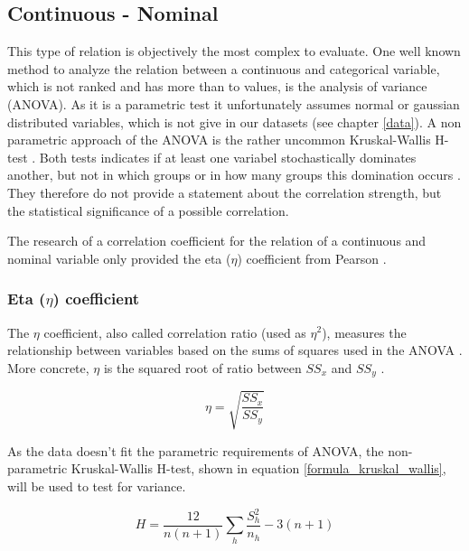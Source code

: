 \documentclass[a4paper,12pt]{report}
\begin{document}
\subsection{Continuous - Nominal}
This type of relation is objectively the most complex to evaluate. One well known method to analyze the relation between a continuous and categorical variable, which is not ranked and has more than to values, is the analysis of variance (ANOVA). As it is a parametric test it unfortunately assumes normal or gaussian distributed variables, which is not give in our datasets (see chapter \ref{data}). A non parametric approach of the ANOVA is the rather uncommon Kruskal-Wallis H-test \cite{Leon1998}. Both tests indicates if at least one variabel stochastically dominates another, but not in which groups or in how many groups this domination occurs \cite{OTSD2020}. They therefore do not provide a statement about the correlation strength, but the statistical significance of a possible correlation.

The research of a correlation coefficient for the relation of a continuous and nominal variable only provided the eta ($\eta$) coefficient from Pearson \cite{Benninghaus2007}. 

\subsubsection{Eta ($\eta$) coefficient}
The $\eta$ coefficient, also called correlation ratio (used as $\eta^2$), measures the relationship between variables based on the sums of squares used in the ANOVA \cite{Lewis2012,Benninghaus2007}. More concrete, $\eta$ is the squared root of ratio between $SS_x$ and $SS_y$ \cite{Shaldehi2013}.

\smallskip
\begin{equation}
\label{formula_eta}	
	\eta = \sqrt{\frac{SS_x}{SS_y}}
\end{equation}

As the data doesn't fit the parametric requirements of ANOVA, the non-parametric Kruskal-Wallis H-test, shown in equation \ref{formula_kruskal_wallis}, will be used to test for variance.

\smallskip
\begin{equation}
\label{formula_kruskal_wallis}	
	H = \frac{12}{n(n+1)}\sum_{h}{\frac{S_h^2}{n_h}}-3(n+1)
\end{equation}
\end{document}
